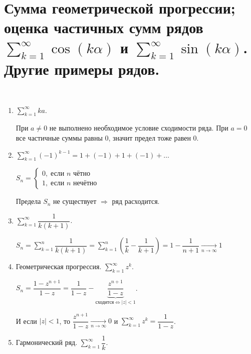 \documentclass[../main.tex]{subfiles}
\begin{document}
\newpage
\section{Сумма геометрической прогрессии; оценка частичных сумм рядов \( \sum_{ k=1}^{ \infty } \cos\left( k \alpha \right)\) и \( \sum_{ k=1}^{ \infty } \sin\left( k \alpha \right)\). Другие примеры рядов.}

\begin{example}
    
    \hypertarget{ex:series}{~}

    \begin{enumerate}
        \item \( \sum\limits_{ k=1}^{ \infty } ka\). \par
        При \( a \neq 0\) не выполнено \hypertarget{thm:nes_converge_series}{необходимое условие сходимости ряда}. При \( a = 0\) все частичные суммы равны 0, значит предел тоже равен 0.
        \item \( \sum\limits_{ k=1}^{ \infty } \left( -1\right)^{k-1}=1 + \left( -1\right)+1+\left( -1\right)+ \ldots \) \par 
        \( S_n= \begin{cases}
            0,\; \text{если } n\text{ чётно}\\ 
            1,\; \text{если } n\text{ нечётно}
        \end{cases}\)
        \par Предела \( S_n\) не существует \( \Longrightarrow\) ряд расходится.
        \item \( \sum\limits_{ k=1}^{ \infty } \dfrac{ 1}{ k\left( k+1\right)} \).\par 
        \( S_n = \sum\limits_{ k=1}^{ n} \dfrac{ 1}{ k\left( k+1\right)} = \sum\limits_{ k=1}^{ n} \left( \dfrac{ 1}{ k} - \dfrac{ 1}{ k+1} \right)= 1 - \dfrac{ 1}{ n+1} \underset{n \rightarrow \infty }{ \longrightarrow }1\)
        \item Геометрическая прогрессия. \( \sum\limits_{ k=1}^{ \infty } z^k\).\par 
        \( S_n= \dfrac{ 1-z^{n+1}}{ 1-z}= \dfrac{ 1}{ 1-z} - \underbrace{\dfrac{ z^{n+1}}{ 1-z}}_{\text{сходится} \Leftrightarrow \left| z\right| <1}  \). \par 
        И если \( \left| z\right| < 1\), то \( \dfrac{ z^{n+1}}{ 1-z} \underset{n \rightarrow \infty }{ \longrightarrow }0\) и \( \sum\limits_{ k=1}^{ \infty } z^k= \dfrac{ 1}{ 1-z} \).
        \item Гармонический ряд. \( \sum\limits_{ k=1}^{ \infty } \dfrac{ 1}{ k} \).\par

\end{enumerate}
\end{example}
\end{document}
